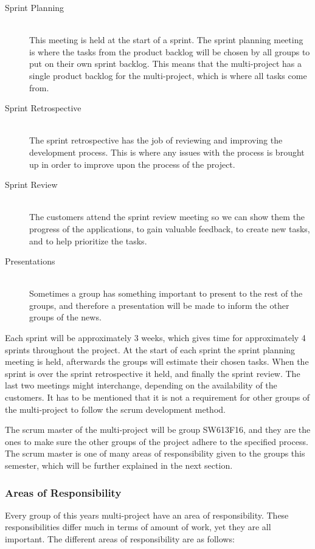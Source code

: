 \begin{description}
	\item[Sprint Planning] \hfill \\
	This meeting is held at the start of a sprint.
	The sprint planning meeting is where the tasks from the product backlog will be chosen by all groups to put on their own sprint backlog.
	This means that the multi-project has a single product backlog for the multi-project, which is where all tasks come from.
	\item[Sprint Retrospective] \hfill \\
	The sprint retrospective has the job of reviewing and improving the development process. 
	This is where any issues with the process is brought up in order to improve upon the process of the project.
	\item[Sprint Review] \hfill \\
	The customers attend the sprint review meeting so we can show them the progress of the applications, to gain valuable feedback, to create new tasks, and to help prioritize the tasks. 
	\item[Presentations] \hfill \\
	Sometimes a group has something important to present to the rest of the groups, and therefore a presentation will be made to inform the other groups of the news.
\end{description}

Each sprint will be approximately 3 weeks, which gives time for approximately 4 sprints throughout the project.
At the start of each sprint the sprint planning meeting is held, afterwards the groups will estimate their chosen tasks.
When the sprint is over the sprint retrospective it held, and finally the sprint review.
The last two meetings might interchange, depending on the availability of the customers.
It has to be mentioned that it is not a requirement for other groups of the multi-project to follow the scrum development method.

The scrum master of the multi-project will be group SW613F16, and they are the ones to make sure the other groups of the project adhere to the specified process.
The scrum master is one of many areas of responsibility given to the groups this semester, which will be further explained in the next section.


\subsubsection*{Areas of Responsibility}
Every group of this years multi-project have an area of responsibility.
These responsibilities differ much in terms of amount of work, yet they are all important.
The different areas of responsibility are as follows:

